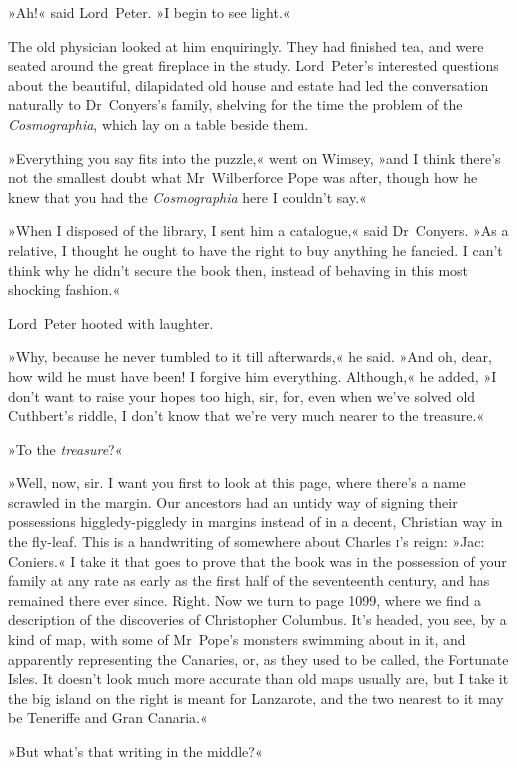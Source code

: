 »Ah!« said Lord~Peter. »I begin to see light.«

The old physician looked at him enquiringly. They had finished tea, and were seated around the great fireplace in the study. Lord~Peter's interested questions about the beautiful, dilapidated old house and estate had led the conversation naturally to Dr~Conyers's family, shelving for the time the problem of the \textit{Cosmographia}, which lay on a table beside them.

»Everything you say fits into the puzzle,« went on Wimsey, »and I think there's not the smallest doubt what Mr~Wilberforce Pope was after, though how he knew that you had the \textit{Cosmographia} here I couldn't say.«

»When I disposed of the library, I sent him a catalogue,« said Dr~Conyers. »As a relative, I thought he ought to have the right to buy anything he fancied. I can't think why he didn't secure the book then, instead of behaving in this most shocking fashion.«

Lord~Peter hooted with laughter.

»Why, because he never tumbled to it till afterwards,« he said. »And oh, dear, how wild he must have been! I forgive him everything. Although,« he added, »I don't want to raise your hopes too high, sir, for, even when we've solved old Cuthbert's riddle, I don't know that we're very much nearer to the treasure.«

»To the \textit{treasure}?«

»Well, now, sir. I want you first to look at this page, where there's a name scrawled in the margin. Our ancestors had an untidy way of signing their possessions higgledy-piggledy in margins instead of in a decent, Christian way in the fly-leaf. This is a handwriting of somewhere about Charles \textsc{i}'s reign: »Jac: Coniers.« I take it that goes to prove that the book was in the possession of your family at any rate as early as the first half of the seventeenth century, and has remained there ever since. Right. Now we turn to page 1099, where we find a description of the discoveries of Christopher Columbus. It's headed, you see, by a kind of map, with some of Mr~Pope's monsters swimming about in it, and apparently representing the Canaries, or, as they used to be called, the Fortunate Isles. It doesn't look much more accurate than old maps usually are, but I take it the big island on the right is meant for Lanzarote, and the two nearest to it may be Teneriffe and Gran Canaria.«

»But what's that writing in the middle?«

